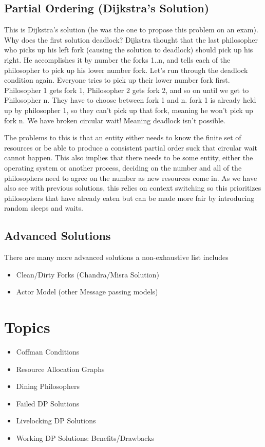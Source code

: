 \subsection{Partial Ordering (Dijkstra's Solution)}\label{partial-ordering-dijkstras-solution}

This is Dijkstra's solution (he was the one to propose this problem on an exam). Why does the first solution deadlock? Dijkstra thought that the last philosopher who picks up his left fork (causing the solution to deadlock) should pick up his right. He accomplishes it by number the forks 1..n, and tells each of the philosopher to pick up his lower number fork. Let's run through the deadlock condition again. Everyone tries to pick up their lower number fork first. Philosopher 1 gets fork 1, Philosopher 2 gets fork 2, and so on until we get to Philosopher n. They have to choose between fork 1 and n. fork 1 is already held up by philosopher 1, so they can't pick up that fork, meaning he won't pick up fork n. We have broken circular wait! Meaning deadlock isn't possible.

The problems to this is that an entity either needs to know the finite set of resources or be able to produce a consistent partial order suck that circular wait cannot happen. This also implies that there needs to be some entity, either the operating system or another process, deciding on the number and all of the philosophers need to agree on the number as new resources come in. As we have also see with previous solutions, this relies on context switching so this prioritizes philosophers that have already eaten but can be made more fair by introducing random sleeps and waits.


\subsection{Advanced Solutions}

There are many more advanced solutions a non-exhaustive list includes 
\begin{itemize}
\item Clean/Dirty Forks (Chandra/Misra Solution) 
\item Actor Model (other Message passing models)
\end{itemize}

\section{Topics}

\begin{itemize}
  \item Coffman Conditions
  \item Resource Allocation Graphs
  \item Dining Philosophers
  \item Failed DP Solutions 
  \item Livelocking DP Solutions 
  \item Working DP Solutions: Benefits/Drawbacks
\end{itemize}

